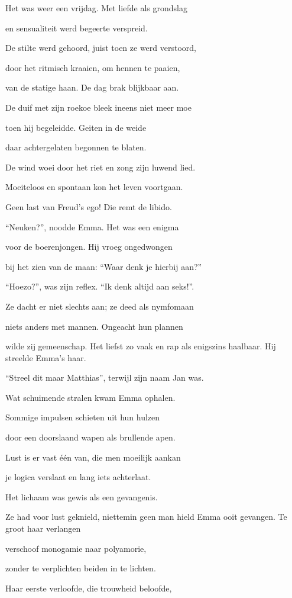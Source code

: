 Het was weer een vrijdag.
Met liefde als grondslag

en sensualiteit
werd begeerte verspreid.

De stilte werd gehoord,
juist toen ze werd verstoord,

door het ritmisch kraaien,
om hennen te paaien,

van de statige haan.
De dag brak blijkbaar aan.

De duif met zijn roekoe
bleek ineens niet meer moe

toen hij begeleidde.
Geiten in de weide

daar achtergelaten
begonnen te blaten.

De wind woei door het riet
en zong zijn luwend lied.

Moeiteloos en spontaan
kon het leven voortgaan.

Geen last van Freud's ego!
Die remt de libido.

“Neuken?”, noodde Emma.
Het was een enigma

voor de boerenjongen.
Hij vroeg ongedwongen

bij het zien van de maan:
“Waar denk je hierbij aan?”

“Hoezo?”, was zijn reflex.
“Ik denk altijd aan seks!”.

Ze dacht er niet slechts aan;
ze deed als nymfomaan

niets anders met mannen.
Ongeacht hun plannen

wilde zij gemeenschap.
Het liefst zo vaak en rap
als enigszins haalbaar.
Hij streelde Emma’s haar.

“Streel dit maar Matthias”,
terwijl zijn naam Jan was.

Wat schuimende stralen
kwam Emma ophalen.

Sommige impulsen
schieten uit hun hulzen

door een doorslaand wapen
als brullende apen.

Lust is er vast één van,
die men moeilijk aankan

je logica verslaat
en lang iets achterlaat.

Het lichaam was gewis
als een gevangenis.

Ze had voor lust geknield,
niettemin geen man hield
Emma ooit gevangen.
Te groot haar verlangen

verschoof monogamie
naar polyamorie,

zonder te verplichten
beiden in te lichten.

Haar eerste verloofde,
die trouwheid beloofde,

